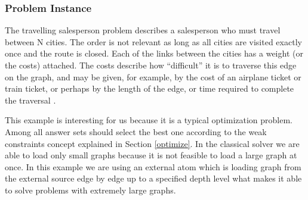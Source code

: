 \documentclass[a4paper, titlepage]{article}
\begin{document}
\subsubsection{Problem Instance}
The travelling salesperson problem describes a salesperson who 
must travel between N cities. The order is not relevant as long as all cities are visited exactly once and the route is closed. Each of the 
links between the cities has a weight (or the 
costs) attached. The costs describe how ``difficult'' it is to 
traverse this edge on the graph, and may be given, for 
example, by the cost of an airplane ticket or train ticket, 
or perhaps by the length of the edge, or time required to 
complete the traversal \cite{wiki}.

This example is interesting for us because it is a typical 
optimization problem. Among all answer sets \dlvhex{} 
should select the best one according to the weak constraints 
concept explained in Section \ref{optimize}. In the 
classical solver we are able to load only small graphs 
because it is not feasible to load a large graph at once. In 
this example we are using an external atom which is loading 
graph from the external source edge by edge up to a  specified 
depth level what makes it able to solve problems with 
extremely large graphs.        
\end{document}
